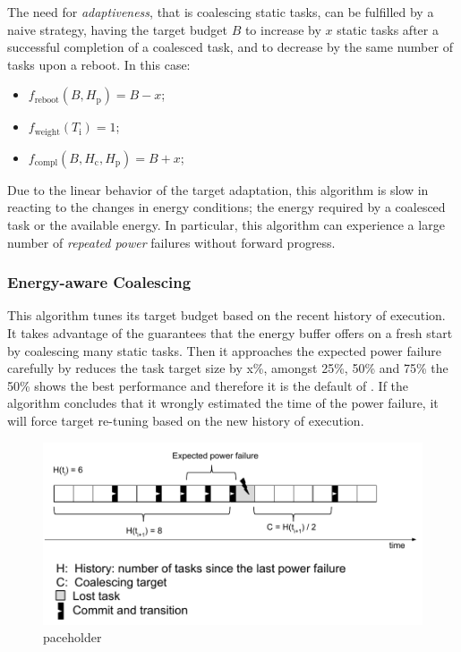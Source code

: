 The need for \emph{adaptiveness}, that is coalescing static tasks, can be fulfilled by a naive strategy, having the target budget $B$ to increase by $x$ static tasks after a successful completion of a coalesced task, and to decrease by the same number of tasks upon a reboot. In this case: 
\begin{itemize}
\item $f_\text{reboot}(B, H_\text{p}) = B - x $;
\item $f_\text{weight}(T_\text{i}) =  1$; 
\item $f_\text{compl}(B,H_\text{c},H_\text{p}) = B + x$; 
\end{itemize}
Due to the linear behavior of the target adaptation, this algorithm is slow in reacting to the changes in energy conditions; the energy required by a coalesced task or the available energy. In particular, this algorithm can experience a large number of \emph{repeated power} failures without forward progress. 

\subsubsection{Energy-aware Coalescing}
\label{subsec:ECoalescing}
This algorithm tunes its target budget based on the recent history of execution. It takes advantage of the guarantees that the energy buffer offers on a fresh start by coalescing many static tasks. Then it approaches the expected power failure carefully by reduces the task target size by x\%, amongst 25\%, 50\% and 75\% the 50\% shows the best performance and therefore it is the default of \sys. If the algorithm concludes that it wrongly estimated the time of the power failure, it will force target re-tuning based on the new history of execution. 


\begin{figure}
	\centering
	\includegraphics[width=0.5\columnwidth]{figures/energy_aware_algo}
	\caption{paceholder}
	\label{fig:energyAware}
\end{figure}

































